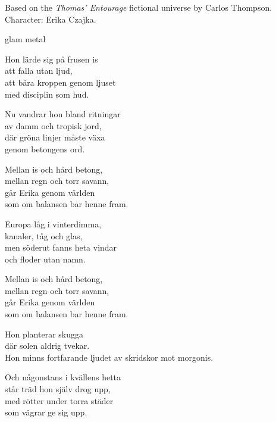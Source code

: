 

\begin{notes}
Based on the \emph{Thomas’ Entourage} fictional universe by Carlos Thompson.\\
Character: Erika Czajka.\\
\end{notes}

\begin{style}
glam metal
\end{style}

\begin{lyrics}

Hon lärde sig på frusen is\\
att falla utan ljud,\\
att bära kroppen genom ljuset\\
med disciplin som hud.

Nu vandrar hon bland ritningar\\
av damm och tropisk jord,\\
där gröna linjer måste växa\\
genom betongens ord.

Mellan is och hård betong,\\
mellan regn och torr savann,\\
går Erika genom världen\\
som om balansen bar henne fram.

Europa låg i vinterdimma,\\
kanaler, tåg och glas,\\
men söderut fanns heta vindar\\
och floder utan namn.

Mellan is och hård betong,\\
mellan regn och torr savann,\\
går Erika genom världen\\
som om balansen bar henne fram.

Hon planterar skugga\\
där solen aldrig tvekar.\\
Hon minns fortfarande ljudet av skridskor mot morgonis.

Och någonstans i kvällens hetta\\
står träd hon själv drog upp,\\
med rötter under torra städer\\
som vägrar ge sig upp.


\end{lyrics}
